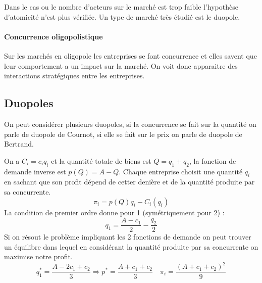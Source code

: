 Dans le cas ou le nombre d'acteurs sur le marché est trop faible l'hypothèse d'atomicité n'est plus vérifiée. Un type de marché très étudié est le duopole. 

\paragraph{Concurrence oligopolistique} %
\label{par:concurrence_oligopolistique}
 Sur les marchés en oligopole les entreprises se font concurrence et elles savent que leur comportement a un impact sur la marché. On voit donc apparaitre des interactions stratégiques entre les entreprises.

\subsection{Duopoles} %
\label{sub:duopoles}


On peut considérer plusieurs duopoles, si la concurrence se fait sur la quantité on parle de duopole de Cournot, si elle se fait sur le prix on parle de duopole de Bertrand.

\begin{tcolorbox}[title=Duopole de Cournot]
	
	On a $C_i=c_iq_i$ et la quantité totale de biens est $Q=q_1+q_2$, la fonction de demande inverse est $p(Q)=A-Q$.
	Chaque entreprise choisit une quantité $q_i$ en sachant que son profit dépend de cetter denière et de la quantité produite par sa concurrente.
	\[
		\pi_i = p(Q)q_i-C_i(q_i)
	\]
	La condition de premier ordre donne pour 1 (symétriquement pour 2) :
	\[
		q_1 = \frac{A-c_1}{2}-\frac{q_2}{2}
	\]
	Si on résout le problème impliquant les 2 fonctions de demande on peut trouver un équilibre dans lequel en considérant la quantité produite par sa concurrente on maximise notre profit.
	\[
		q_1^* = \frac{A-2c_1+c_2}{3} \Rightarrow p^* = \frac{A+c_1+c_2}{3} \quad \pi_i= \frac{(A+c_1+c_2)^2}{9}
	\]
	
\end{tcolorbox}

